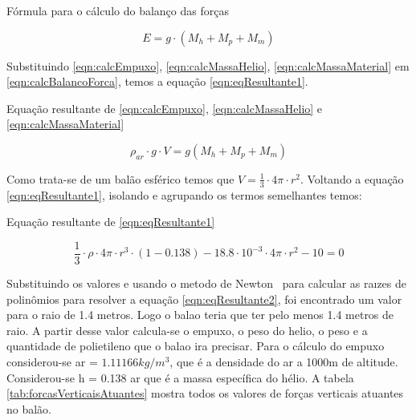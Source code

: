 	\begin{equacao}
	\caption{Fórmula para o cálculo do balanço das forças}
		\begin{equation}
			E = g \cdot (M_{h} + M_{p} + M_{m})
		\end{equation}
		\label{eqn:calcBalancoForca}
	\end{equacao}

	Substituindo \eqref{eqn:calcEmpuxo}, \eqref{eqn:calcMassaHelio}, \eqref{eqn:calcMassaMaterial} em \eqref{eqn:calcBalancoForca}, temos a equação \eqref{eqn:eqResultante1}.

	\begin{equacao}
	\caption{Equação resultante de \eqref{eqn:calcEmpuxo}, \eqref{eqn:calcMassaHelio} e \eqref{eqn:calcMassaMaterial}}
		\begin{equation}
			\rho_{ar} \cdot g \cdot V = g(M_{h} + M_{p} + M_{m})
		\end{equation}
		\label{eqn:eqResultante1}
	\end{equacao}

	Como trata-se de um balão esférico temos que $V = \frac{1}{3} \cdot 4 \pi \cdot r^2$. Voltando a equação \eqref{eqn:eqResultante1}, isolando e agrupando os termos semelhantes temos:

	\begin{equacao}
	\caption{Equação resultante de \eqref{eqn:eqResultante1}}
		\begin{equation}
			\frac{1}{3} \cdot \rho \cdot 4 \pi \cdot r^3 \cdot (1 - 0.138) - 18.8 \cdot 10^{-3} \cdot 4 \pi \cdot r^2 - 10 = 0
		\end{equation}
		\label{eqn:eqResultante2}
	\end{equacao}

	Substituindo os valores e usando o metodo de Newton~\cite[pp.~174--175]{hoffman} para calcular as raızes de polinômios para resolver a equação \eqref{eqn:eqResultante2}, foi encontrado um valor para o raio de 1.4 metros. Logo o balao teria que ter pelo menos 1.4 metros de raio. A partir desse valor calcula-se o empuxo, o peso do helio, o peso e a quantidade de polietileno que o balao ira precisar. Para o cálculo do empuxo considerou-se ar  = $1.11166 kg/m^3$, que é a densidade do ar a 1000m de altitude. Considerou-se h = 0.138 ar que é a massa específica do hélio. A tabela \ref{tab:forcasVerticaisAtuantes} mostra todos os valores de forças verticais atuantes no balão.

